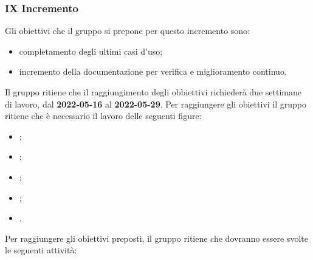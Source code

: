 \subsubsection{IX Incremento}
Gli obiettivi che il gruppo si prepone per questo incremento sono:
\begin{itemize}
	\item completamento degli ultimi casi d'uso;
  	\item incremento della documentazione per verifica e miglioramento continuo.
\end{itemize}
Il gruppo ritiene che il raggiungimento degli obbiettivi richiederà due settimane di lavoro, dal \textbf{2022-05-16} al \textbf{2022-05-29}.
Per raggiungere gli obiettivi il gruppo ritiene che è necessario il lavoro delle seguenti figure:
\begin{itemize}
	\item \RE{};
 	\item \AM{};
   	\item \PT{};
    \item \PR{};
   	\item \VE{}.
\end{itemize}
Per raggiungere gli obiettivi preposti, il gruppo ritiene che dovranno essere svolte le seguenti attività:
